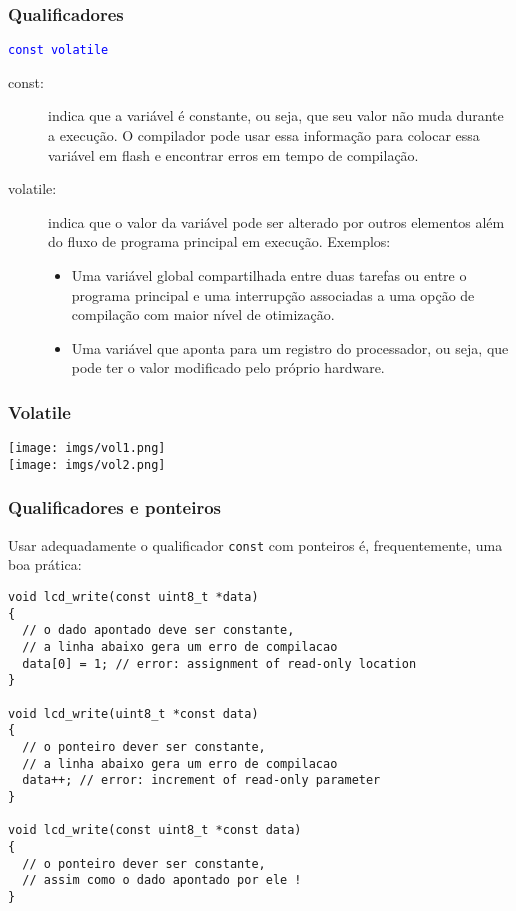 \documentclass{beamer}
\begin{document}
\begin{frame}
	\frametitle{Qualificadores}
	\begin{center}
		\texttt{\textcolor{blue}{const volatile}}
	\end{center}
		\vspace*{0.5cm}
	\begin{description}
	\item [const:] indica que a variável é constante, ou seja, que seu valor não muda durante a execução. O compilador pode usar essa informação para colocar essa variável em flash e encontrar erros em tempo de compilação.
	\item [volatile:] indica que o valor da variável pode ser alterado por outros elementos além do fluxo de programa principal em execução. Exemplos:
    {\footnotesize
    \begin{itemize}
    \item Uma variável global compartilhada entre duas tarefas ou entre o programa principal e uma interrupção associadas a uma opção de compilação com maior nível de otimização.
    \item Uma variável que aponta para um registro do processador, ou seja, que pode ter o valor modificado pelo próprio hardware.
    \end{itemize}
    }
	\end{description}
\end{frame}

\begin{frame}
	\frametitle{Volatile}
	\begin{center}
		\texttt{[image: imgs/vol1.png]} \\
		\texttt{[image: imgs/vol2.png]}
	\end{center}
\end{frame}

	
\begin{frame}[fragile]
	\frametitle{Qualificadores e ponteiros}
    Usar adequadamente o qualificador \texttt{const} com ponteiros é, frequentemente, uma boa prática:
		\vspace*{0.5cm}
	\begin{lstlisting}[style=customc]
void lcd_write(const uint8_t *data)
{
  // o dado apontado deve ser constante,
  // a linha abaixo gera um erro de compilacao
  data[0] = 1; // error: assignment of read-only location
}

void lcd_write(uint8_t *const data)
{
  // o ponteiro dever ser constante,
  // a linha abaixo gera um erro de compilacao
  data++; // error: increment of read-only parameter
}

void lcd_write(const uint8_t *const data)
{
  // o ponteiro dever ser constante,
  // assim como o dado apontado por ele !
}
	\end{lstlisting}
\end{frame}
\end{document}
